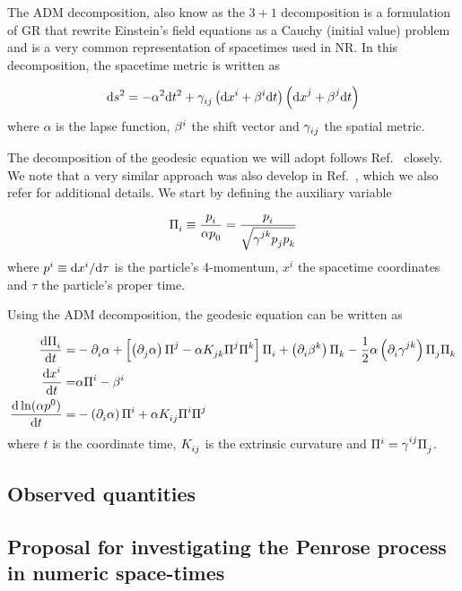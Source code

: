 The ADM decomposition, also know as the $3+1$ decomposition is a formulation of GR that rewrite Einstein's field equations as a Cauchy (initial value) problem and is a very common representation of spacetimes used in NR. In this decomposition, the spacetime metric is written as~\cite{BAUMGARTE}

\begin{equation}
  \ud s^2 = -\alpha^2 \ud t^2 + \tens{\gamma}{}{ij} \left( \ud \tens{x}{i}{} + \tens{\beta}{i}{}\ud t\right) \left( \ud \tens{x}{j}{} + \tens{\beta}{j}{}\ud t\right)
  \label{ch:penrose_binaries/eq:adm_metric}
\end{equation}
%
where $\alpha$ is the lapse function, $\tens{\beta}{i}{}$ the shift vector and $\tens{\gamma}{}{ij}$ the spatial metric.

The decomposition of the geodesic equation we will adopt follows Ref.~\cite{BOHN2015} closely. We note that a very similar approach was also develop in Ref.~\cite{VINCENT2012}, which we also refer for additional details. We start by defining the auxiliary variable

\begin{equation}
  \tens{\Pi}{}{i} \equiv \frac{\tens{p}{}{i}}{\alpha \tens{p}{}{0}} = \frac{\tens{p}{}{i}}{\sqrt{\tens{\gamma}{jk}{} \tens{p}{}{j} \tens{p}{}{k}}}
  \label{ch:penrose_binaries/eq:big_pi_def}
\end{equation}
%
where $p^i \equiv \mathrm{d} x^{i}/\mathrm{d} \tau$ is the particle's 4-momentum, $x^i$ the spacetime coordinates and $\tau$ the particle's proper time.

Using the ADM decomposition, the geodesic equation can be written as~\cite{BOHN2015}

\begin{align}
  \der{\tens{\Pi}{}{i}}{t} =          & -\indexdel{i}\alpha + \left[ \left( \indexdel{j}\alpha \right) \tens{\Pi}{j}{} - \alpha \tens{K}{}{jk} \tens{\Pi}{j}{} \tens{\Pi}{k}{}\right]\tens{\Pi}{}{i} + \left( \indexdel{i}\tens{\beta}{k}{} \right) \tens{\Pi}{}{k} - \frac{1}{2} \alpha \left( \indexdel{i} \tens{\gamma}{jk}{} \right) \tens{\Pi}{}{j} \tens{\Pi}{}{k} \\
  \der{\tens{x}{i}{}}{t} =            & \alpha \tens{\Pi}{i}{} - \tens{\beta}{i}{}                                                                                                                                                                                                                                                                                       \\
  \der{\ln(\alpha\tens{p}{0}{})}{t} = & -\left( \indexdel{i} \alpha \right) \tens{\Pi}{i}{} + \alpha \tens{K}{}{ij}\tens{\Pi}{i}{}\tens{\Pi}{j}{}
  \label{ch:penrose_binaries/eq:adm_geodesic_eq}
\end{align}
%
where $t$ is the coordinate time, $\tens{K}{}{ij}$ is the extrinsic curvature and $\tens{\Pi}{i}{} = \tens{\gamma}{ij}{}\tens{\Pi}{}{j}$.
\subsection{Observed quantities}
\subsection{Proposal for investigating the Penrose process in numeric space-times}